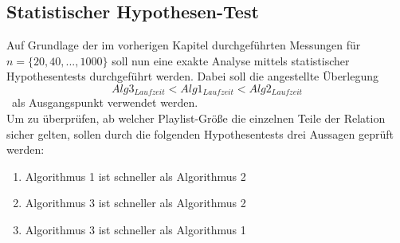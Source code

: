 \documentclass[
10pt, %
a4paper, %
oneside, %
headinclude,footinclude, %
BCOR5mm, %
]{scrartcl}
\begin{document}
\subsection{Statistischer Hypothesen-Test}
Auf Grundlage der im vorherigen Kapitel durchgeführten Messungen für \(n = \{20,40,...,1000\}\) soll nun eine exakte Analyse mittels statistischer Hypothesentests durchgeführt werden. Dabei soll die angestellte Überlegung\\
\begin{equation}
Alg3_{Laufzeit} < Alg1_{Laufzeit} < Alg2_{Laufzeit}
\end{equation}\
als Ausgangspunkt verwendet werden.\\ Um zu überprüfen, ab welcher Playlist-Größe die einzelnen Teile der Relation sicher gelten, sollen durch die folgenden Hypothesentests drei Aussagen geprüft werden:
\begin{enumerate}[noitemsep]
	\item Algorithmus 1 ist schneller als Algorithmus 2
	\item Algorithmus 3 ist schneller als Algorithmus 2
	\item Algorithmus 3 ist schneller als Algorithmus 1
\end{enumerate}\
\end{document}
